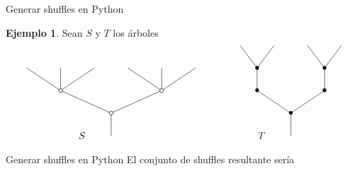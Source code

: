 \documentclass[12pt,aspectratio=169]{beamer}
\numberwithin{equation}{section}
\theoremstyle{definition}
\newtheorem{ex}[teo]{Ejemplo}
\begin{document}
{\begin{frame}{Generar shuffles en Python}
    \begin{ex}
        Sean $S$ y $T$ los \'arboles
        $$
            \xy
            <0.08cm, 0cm>:
            (0.0, 0.0)*{}="1"; %
            (0.0, 10.0)*\cir<2pt>{}="2"; %
            (-22.5, 20.0)*\cir<2pt>{}="3"; %
            (-37.5, 30.0)*{}="4"; %
            (-22.5, 30.0)*{}="5"; %
            (-7.5, 30.0)*{}="6"; %
            (22.5, 20.0)*\cir<2pt>{}="7"; %
            (7.5, 30.0)*{}="8"; %
            (22.5, 30.0)*{}="9"; %
            (37.5, 30.0)*{}="10"; %
            "1";"2" **\dir{-};
            "2";"3" **\dir{-};
            "3";"4" **\dir{-};
            "3";"5" **\dir{-};
            "3";"6" **\dir{-};
            "2";"7" **\dir{-};
            "7";"8" **\dir{-};
            "7";"9" **\dir{-};
            "7";"10" **\dir{-};
            (-13,0)*{S};
            \endxy
            \xy
            <0.08cm, 0cm>:
            (-10, 0.0)*{}="1";
            (10, 10.0)*{}="2";
            \endxy
            \xy
            <0.08cm, 0cm>:
            (0.0, 0.0)*{}="1"; %
            (0.0, 10.0)*=0{\bullet}="2"; %
            (-15.0, 20.0)*=0{\bullet}="3"; %
            (-15.0, 30.0)*=0{\bullet}="4"; %
            (-22.5, 40.0)*{}="5"; %
            (-7.5, 40.0)*{}="6"; %
            (15.0, 20.0)*=0{\bullet}="7"; %
            (15.0, 30.0)*=0{\bullet}="8"; %
            (7.5, 40.0)*{}="9"; %
            (22.5, 40.0)*{}="10"; %
            "1";"2" **\dir{-};
            "2";"3" **\dir{-};
            "3";"4" **\dir{-};
            "4";"5" **\dir{-};
            "4";"6" **\dir{-};
            "2";"7" **\dir{-};
            "7";"8" **\dir{-};
            "8";"9" **\dir{-};
            "8";"10" **\dir{-};
            (-13,0)*{T};
            \endxy
        $$
    \end{ex}
\end{frame}
\begin{frame}{Generar shuffles en Python}
    El conjunto de shuffles resultante ser\'ia
    \begin{center}\end{center}

\end{frame}
}
\end{document}
